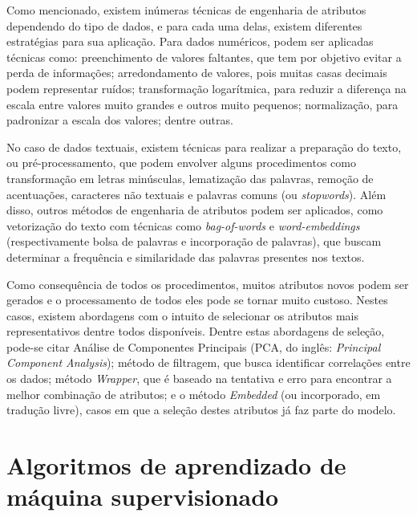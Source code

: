 \documentclass[oneside,openright,12pt]{ufsm_2015} %
\begin{document}
    \par Como mencionado, existem inúmeras técnicas de engenharia de atributos dependendo do tipo de dados, e para cada uma delas, existem diferentes estratégias para sua aplicação. Para dados numéricos, podem ser aplicadas técnicas como: preenchimento de valores faltantes, que tem por objetivo evitar a perda de informações; arredondamento de valores, pois muitas casas decimais podem representar ruídos; transformação logarítmica, para reduzir a diferença na escala entre valores muito grandes e outros muito pequenos; normalização, para padronizar a escala dos valores; dentre outras.
    
    \par No caso de dados textuais, existem técnicas para realizar a preparação do texto, ou pré-processamento, que podem envolver alguns procedimentos como transformação em letras minúsculas, lematização das palavras, remoção de acentuações, caracteres não textuais e palavras comuns (ou \textit{stopwords}). Além disso, outros métodos de engenharia de atributos podem ser aplicados, como vetorização do texto com técnicas como \textit{bag-of-words} \cite{mikolov:2013:2} e \textit{word-embeddings} \cite{mikolov:2013:1} (respectivamente bolsa de palavras e incorporação de palavras), que buscam determinar a frequência e similaridade das palavras presentes nos textos.
    
    \par Como consequência de todos os procedimentos, muitos atributos novos podem ser gerados e o processamento de todos eles pode se tornar muito custoso. Nestes casos, existem abordagens com o intuito de selecionar os atributos mais representativos dentre todos disponíveis. Dentre estas abordagens de seleção, pode-se citar Análise de Componentes Principais (PCA, do inglês: \textit{Principal Component Analysis}); método de filtragem, que busca identificar correlações entre os dados; método \textit{Wrapper}, que é baseado na tentativa e erro para encontrar a melhor combinação de atributos; e o método \textit{Embedded} (ou incorporado, em tradução livre), casos em que a seleção destes atributos já faz parte do modelo.


\section{Algoritmos de aprendizado de máquina supervisionado}
\label{sec:fund-alg-am-sup}
\end{document}
